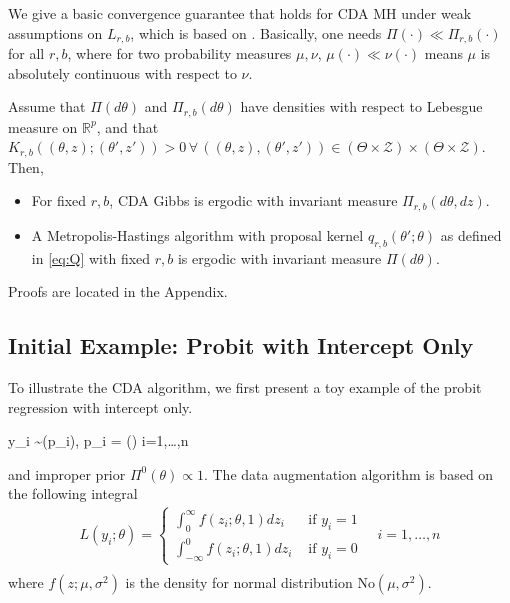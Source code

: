 \documentclass[twoside,11pt]{article}
\newcommand{\be}{\begin{equs}}
\newcommand{\ee}{\end{equs}}
\newcommand{\bb}[1]{\mathbb{#1}}
\newcommand{\mc}[1]{\mathcal{#1}}
\newcommand{\No}{\text{No}}
\newcommand{\Bern}{\text{Bernoulli}}
\newcommand{\1}{\mathbf 1}
\begin{document}
We give a basic convergence guarantee that holds for CDA MH under weak assumptions on $L_{r,b}$, which is based on \cite{roberts1994simple}. Basically, one needs $\Pi(\cdot) \ll \Pi_{r,b}(\cdot)$ for all $r,b$, where for two probability measures $\mu,\nu$, $\mu(\cdot) \ll \nu(\cdot)$ means $\mu$ is absolutely continuous with respect to $\nu$.
\begin{remark}[Ergodicity] \label{rem:ergodic}
Assume that $\Pi(d\theta)$ and $\Pi_{r,b}(d\theta)$ have densities with respect to Lebesgue measure on $\bb R^p$, and that $K_{r,b}((\theta,z);(\theta',z'))>0 \,\forall\, ((\theta,z),(\theta',z')) \in (\Theta \times \mc Z) \times (\Theta \times \mc Z)$. Then, 
\begin{itemize}
\item For fixed $r,b$, CDA Gibbs is ergodic with invariant measure $\Pi_{r,b}(d\theta,dz)$.
\item A Metropolis-Hastings algorithm with proposal kernel $q_{r,b}(\theta';\theta)$ as defined in \eqref{eq:Q} with fixed $r,b$ is ergodic with invariant measure $\Pi(d\theta)$.
\end{itemize}
\end{remark}
Proofs are located in the Appendix. 


\subsection{Initial Example: Probit with Intercept Only}
To illustrate the CDA algorithm, we first present a toy example of the probit regression with intercept only.
\be
y_i \sim \Bern(p_i), \quad p_i = \Phi(\theta) \quad i=1,\ldots,n
\ee
and improper prior $\Pi^0(\theta) \propto 1$. {The data augmentation algorithm \citep{tanner1987calculation,albert1993bayesian} is based on the following integral}
\begin{equation*}
	\begin{aligned}
    L(y_i;\theta) = 
    \left\{ \begin{array}{cc} \int_{0}^{\infty} f(z_i ; \theta,1 )dz_i & \text{ if } y_i = 1 \\ \int_{-\infty}^{0} f(z_i ; \theta,1 )dz_i  & \text{ if } y_i = 0 \end{array} \right. \quad i=1,\ldots,n\\
	\end{aligned}
\end{equation*}
where $f(z; \mu,\sigma^2)$ is the density for normal distribution $\No(\mu,\sigma^2)$. 
\end{document}
